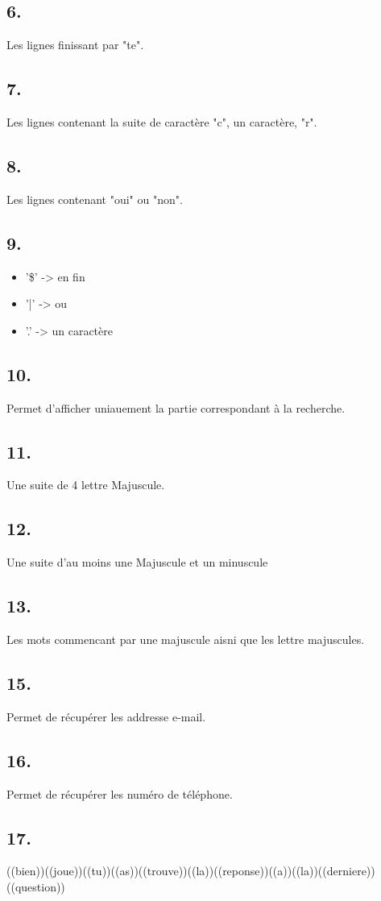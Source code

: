         \subsection{6.}
            Les lignes finissant par "te".
        \subsection{7.}
            Les lignes contenant la suite de caractère "c", un caractère, "r".
        \subsection{8.}
            Les lignes contenant "oui" ou "non".
        \subsection{9.}
            \begin{itemize}
                \item '\$' -> en fin
                \item '|' -> ou
                \item '.' -> un caractère
            \end{itemize}
        \subsection{10.}
            Permet d'afficher uniauement la partie correspondant à la recherche.
        \subsection{11.}
           Une suite de 4 lettre Majuscule.
        \subsection{12.}
            Une suite d'au moins une Majuscule et un minuscule
        \subsection{13.}
            Les mots commencant par une majuscule aisni que les lettre majuscules.
        \subsection{15.}
            Permet de récupérer les addresse e-mail.
        \subsection{16.}
            Permet de récupérer les numéro de téléphone.
        \subsection{17.}
            ((bien))((joue))((tu))((as))((trouve))((la))((reponse))((a))((la))((derniere))((question))
